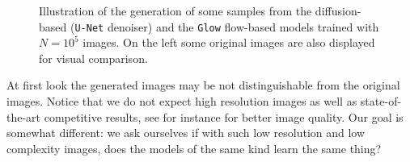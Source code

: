 \documentclass[11pt]{amsart}
\begin{document}
\begin{figure}
\begin{subfigure}[t]{0.30\columnwidth}
\begin{center}
    \end{center}
    \end{subfigure}%
    \begin{subfigure}[t]{0.30\columnwidth}
        \centering
    \end{subfigure}
    \caption{Illustration of the generation of some samples from the diffusion-based (\texttt{U-Net} denoiser) and the \texttt{Glow} flow-based models trained with $N=10^5$ images. On the left some original images are also displayed for visual comparison.}
    \label{fig-Original-Glow-UNet-samples}
\end{figure}
At first look the generated images may be not distinguishable from the original images. Notice that we do not expect high resolution images as well as state-of-the-art competitive results, see for instance \citep{ravanbakhsh2016,Fussell2019,Lanusse2021,smith2021,HACKSTEIN2023100685} for better image quality. Our goal is somewhat different: we ask ourselves if with such low resolution and low complexity images, does the models of the same kind learn the same thing?
%
\end{document}
